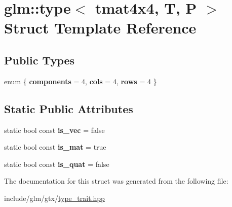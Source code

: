 \hypertarget{structglm_1_1type_3_01tmat4x4_00_01T_00_01P_01_4}{}\section{glm\+:\+:type$<$ tmat4x4, T, P $>$ Struct Template Reference}
\label{structglm_1_1type_3_01tmat4x4_00_01T_00_01P_01_4}
\subsection*{Public Types}
\begin{DoxyCompactItemize}
\item 
\mbox{\label{structglm_1_1type_3_01tmat4x4_00_01T_00_01P_01_4_a58bae195f2945e8bacb823f6619f0f24}} 
enum \{ {\bfseries components} = 4, 
{\bfseries cols} = 4, 
{\bfseries rows} = 4
 \}
\end{DoxyCompactItemize}
\subsection*{Static Public Attributes}
\begin{DoxyCompactItemize}
\item 
\mbox{\label{structglm_1_1type_3_01tmat4x4_00_01T_00_01P_01_4_a4419e728cd42ebd91882e8ca3930d483}} 
static bool const {\bfseries is\+\_\+vec} = false
\item 
\mbox{\label{structglm_1_1type_3_01tmat4x4_00_01T_00_01P_01_4_a3bc0b9ef269a235e7b2d5906e2e7253c}} 
static bool const {\bfseries is\+\_\+mat} = true
\item 
\mbox{\label{structglm_1_1type_3_01tmat4x4_00_01T_00_01P_01_4_a9a1b997e80e58045c52834e655152b6b}} 
static bool const {\bfseries is\+\_\+quat} = false
\end{DoxyCompactItemize}


The documentation for this struct was generated from the following file\+:\begin{DoxyCompactItemize}
\item 
include/glm/gtx/\hyperlink{type__trait_8hpp}{type\+\_\+trait.\+hpp}\end{DoxyCompactItemize}
